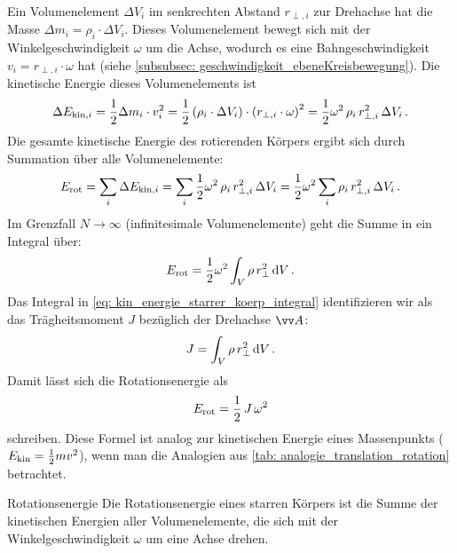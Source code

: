 Ein Volumenelement $\Delta V_i$ im senkrechten Abstand $r_{\perp,i}$ zur Drehachse hat die Masse $\Delta m_i = \rho_i \cdot \Delta V_i$. Dieses Volumenelement bewegt sich mit der Winkelgeschwindigkeit $\omega$ um die Achse, wodurch es eine Bahngeschwindigkeit $v_i = r_{\perp,i} \cdot \omega$ hat (siehe \cref{subsubsec: geschwindigkeit_ebeneKreisbewegung}). Die kinetische Energie dieses Volumenelements ist
\begin{equation}\label{eq: kin_energie_volumenelement}
    \Delta E_{\mathrm{kin},i} = \frac{1}{2} \Delta m_i \cdot v_i^2 = \frac{1}{2} \left(\rho_i \cdot \Delta V_i \right) \cdot {\left(r_{\perp,i} \cdot \omega\right)}^2 = \frac{1}{2} \omega^2\, \rho_i \, r_{\perp,i}^2 \, \Delta V_i \,.
\end{equation}
Die gesamte kinetische Energie des rotierenden Körpers ergibt sich durch Summation über alle Volumenelemente:
\begin{equation}\label{eq: kin_energie_starrer_koerp_sum}
    E_{\mathrm{rot}} = \sum_{i} \Delta E_{\mathrm{kin},i} = \sum_{i} \frac{1}{2} \omega^2 \, \rho_i \, r_{\perp,i}^2 \, \Delta V_i = \frac{1}{2} \omega^2 \sum_{i} \rho_i \, r_{\perp,i}^2 \, \Delta V_i \,.
\end{equation}
Im Grenzfall $N \to \infty$ (infinitesimale Volumenelemente) geht die Summe in ein Integral über:
\begin{equation}\label{eq: kin_energie_starrer_koerp_integral}
    E_{\mathrm{rot}} = \frac{1}{2} \omega^2 \int_V \rho \, r_{\perp}^2 \,\mathrm{d}V \,.
\end{equation}
Das Integral in \cref{eq: kin_energie_starrer_koerp_integral} identifizieren wir als das Trägheitsmoment $J$ bezüglich der Drehachse $\ivec{A}$:
\begin{equation}\label{eq: traegheitsmoment_herleitung}
    J = \int_V \rho\, r_{\perp}^2 \,\mathrm{d}V \,.
\end{equation}
Damit lässt sich die Rotationsenergie als
\begin{equation}\label{eq: rot_energie_traegheitsmoment}
    E_{\mathrm{rot}} = \frac{1}{2} \, J \, \omega^2
\end{equation}
schreiben. Diese Formel ist analog zur kinetischen Energie eines Massenpunkts ($E_{\mathrm{kin}} = \frac{1}{2} m v^2$), wenn man die Analogien aus \cref{tab: analogie_translation_rotation} betrachtet. 

\begin{rememberbox}{Rotationsenergie}
    Die Rotationsenergie eines starren Körpers ist die Summe der kinetischen Energien aller Volumenelemente, die sich mit der Winkelgeschwindigkeit $\omega$ um eine Achse drehen.
\end{rememberbox}



